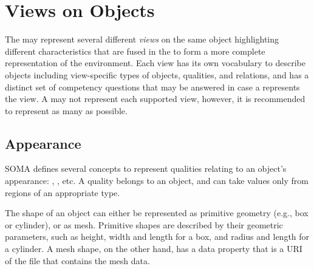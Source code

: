 \section{Views on Objects}
\label{sec:background:views}

The \neembak may represent several different \emph{views} on the same object highlighting different characteristics that are fused in the \neembak to form a more complete representation of the environment.
Each view has its own vocabulary to describe objects including view-specific types of objects, qualities, and relations, and has a distinct set of competency questions that may be answered in case a \neem represents the view.
A \neem may not represent each supported view, however, it is recommended to represent as many as possible.

\subsection{Appearance}

SOMA defines several concepts to represent qualities relating to an object's appearance:
, ,  %
etc.
A quality belongs to an object, and can take values only from regions of an appropriate type. 

The shape of an object can either be represented
as primitive geometry
(e.g., box or cylinder),
or as mesh. %
Primitive shapes are described by their geometric parameters, such as height, width and length for a box, and radius and length for a cylinder.
A mesh shape, on the other hand, has a data property that is a URI of the file that contains the mesh data.

